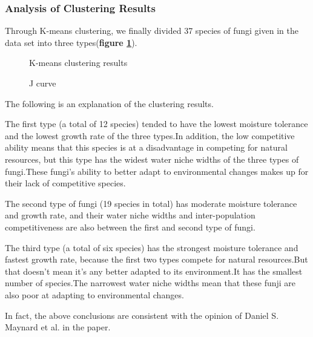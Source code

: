\documentclass[12pt]{article}
\begin{document}
\subsubsection{Analysis of Clustering Results}
Through K-means clustering, we finally divided 37 species of fungi given in the data set into three types(\textbf{figure \ref{figure:clustering_results_type}}).\par

\begin{figure}[h]
	\centering
	\caption{K-means clustering results}
	\label{figure:clustering_results_type}
\end{figure}

\begin{figure}[h]
	\centering
	\caption{J curve}
	\label{figure:J_curve}
\end{figure}

The following is an explanation of the clustering results.\par
The first type (a total of 12 species) tended to have the lowest moisture tolerance and the lowest growth rate of the three types.In addition, the low competitive ability means that this species is at a disadvantage in competing for natural resources, but this type has the widest water niche widths of the three types of fungi.These fungi's ability to better adapt to environmental changes makes up for their lack of competitive species.\par%
The  second type of fungi (19 species in total) has moderate moisture tolerance and growth rate, and their water niche widths and inter-population competitiveness are also between the first and second type of fungi.\par%
The third type (a total of six species) has the strongest moisture tolerance and fastest growth rate, because the first two types compete for natural resources.But that doesn't mean it's any better adapted to its environment.It has the smallest number of species.The narrowest water niche widths mean that these funji are also poor at adapting to environmental changes.\par
In fact, the above conclusions are consistent with the opinion of Daniel S. Maynard et al. in the paper\cite{3}.
\end{document}
